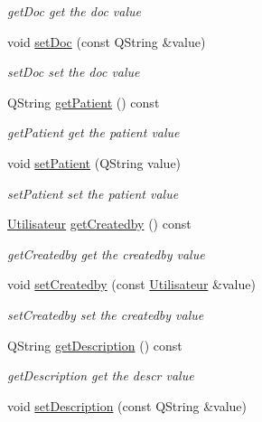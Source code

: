 \begin{DoxyCompactItemize}
\begin{DoxyCompactList}\small\item\em get\+Doc get the doc value \end{DoxyCompactList}\item 
void \mbox{\hyperlink{class_r_d_v_a3adc9de12843f5901de9dd1e08954de4}{set\+Doc}} (const Q\+String \&value)
\begin{DoxyCompactList}\small\item\em set\+Doc set the doc value \end{DoxyCompactList}\item 
Q\+String \mbox{\hyperlink{class_r_d_v_ad8bcbe648c260b33331ea444cb51b41f}{get\+Patient}} () const
\begin{DoxyCompactList}\small\item\em get\+Patient get the patient value \end{DoxyCompactList}\item 
void \mbox{\hyperlink{class_r_d_v_a330240101b7580edad087123afbf96a1}{set\+Patient}} (Q\+String value)
\begin{DoxyCompactList}\small\item\em set\+Patient set the patient value \end{DoxyCompactList}\item 
\mbox{\hyperlink{class_utilisateur}{Utilisateur}} \mbox{\hyperlink{class_r_d_v_a1e3795af73f12576b94d6c75e65e4df6}{get\+Createdby}} () const
\begin{DoxyCompactList}\small\item\em get\+Createdby get the createdby value \end{DoxyCompactList}\item 
void \mbox{\hyperlink{class_r_d_v_a7899f8ed714f31e6d8ffa8c998d21f4b}{set\+Createdby}} (const \mbox{\hyperlink{class_utilisateur}{Utilisateur}} \&value)
\begin{DoxyCompactList}\small\item\em set\+Createdby set the createdby value \end{DoxyCompactList}\item 
Q\+String \mbox{\hyperlink{class_r_d_v_aaa33b12beb34bc80e06a612e25ca604b}{get\+Description}} () const
\begin{DoxyCompactList}\small\item\em get\+Description get the descr value \end{DoxyCompactList}\item 
void \mbox{\hyperlink{class_r_d_v_a2fb6c269a4395db5525cf31199b301d9}{set\+Description}} (const Q\+String \&value)

\end{DoxyCompactItemize}
